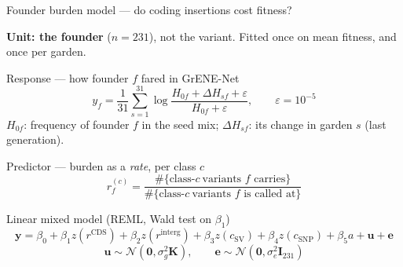 \documentclass[aspectratio=169,11pt]{beamer}
\newcommand{\tightdisplays}{\setlength{\abovedisplayskip}{3pt}\setlength{\belowdisplayskip}{3pt}%
  \setlength{\abovedisplayshortskip}{3pt}\setlength{\belowdisplayshortskip}{3pt}}
\begin{document}
\begin{frame}[shrink]{Founder burden model --- do coding insertions cost fitness?}
\small\tightdisplays

\textbf{Unit: the founder} ($n=231$), not the variant. Fitted once on mean fitness,
and once per garden.
\vspace{-2pt}

\begin{block}{Response --- how founder $f$ fared in GrENE-Net}
\[
y_f=\frac{1}{31}\sum_{s=1}^{31}
\log\!\frac{H_{0f}+\Delta H_{sf}+\varepsilon}{H_{0f}+\varepsilon},
\qquad \varepsilon=10^{-5}
\]
$H_{0f}$: frequency of founder $f$ in the seed mix;\;
$\Delta H_{sf}$: its change in garden $s$ (last generation).
\end{block}
\vspace{-4pt}

\begin{block}{Predictor --- burden as a \emph{rate}, per class $c$}
\[
r^{(c)}_f=\frac{\#\{\text{class-}c\ \text{variants } f \text{ carries}\}}
                {\#\{\text{class-}c\ \text{variants } f \text{ is called at}\}}
\]
\end{block}
\vspace{-4pt}

\begin{block}{Linear mixed model (REML, Wald test on $\beta_1$)}
\[
\mathbf{y}=\beta_0+\beta_1 z\!\left(r^{\mathrm{CDS}}\right)
+\beta_2 z\!\left(r^{\mathrm{interg}}\right)
+\beta_3 z(c_{\mathrm{SV}})+\beta_4 z(c_{\mathrm{SNP}})+\beta_5 a
+\mathbf{u}+\mathbf{e}
\]
\[
\mathbf{u}\sim\mathcal{N}(\mathbf{0},\sigma^2_g\mathbf{K}),\qquad
\mathbf{e}\sim\mathcal{N}(\mathbf{0},\sigma^2_e\mathbf{I}_{231})
\]
\end{block}

\end{frame}
\end{document}

